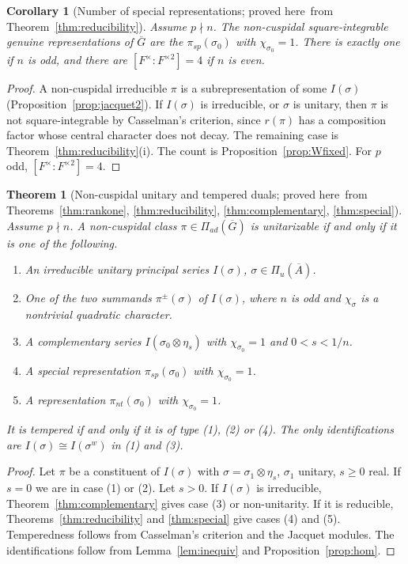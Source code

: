 \documentclass[12pt,letterpaper]{article}
\numberwithin{equation}{section}
\newtheorem{xtheorem}[theorem]{Theorem}
\newtheorem{xcorollary}[theorem]{Corollary}
\theoremstyle{definition}
\newcommand{\proved}{proved here}
\newcommand{\bG}{\overline{G}}
\newcommand{\bA}{\overline{A}}
\newcommand{\Pia}{\Pi_{ad}(\bG)}
\begin{document}
\begin{xcorollary}[Number of special representations; \proved\ from
Theorem~\ref{thm:reducibility}]\label{cor:count-special}
Assume $p\nmid n$.  The non-cuspidal square-integrable genuine representations of $\bG$
are the $\pi_{sp}(\sigma_0)$ with $\chi_{\sigma_0}=1$.  There is exactly one if $n$ is odd,
and there are $[F^\times:F^{\times2}]=4$ if $n$ is even.
\end{xcorollary}
\begin{proof}
A non-cuspidal irreducible $\pi$ is a subrepresentation of some $I(\sigma)$
(Proposition~\ref{prop:jacquet2}).  If $I(\sigma)$ is irreducible, or $\sigma$ is unitary,
then $\pi$ is not square-integrable by Casselman's criterion, since $r(\pi)$ has a
composition factor whose central character does not decay.  The remaining case is
Theorem~\ref{thm:reducibility}(i).  The count is Proposition~\ref{prop:Wfixed}.  For $p$
odd, $[F^\times:F^{\times2}]=4$.
\end{proof}

\begin{xtheorem}[Non-cuspidal unitary and tempered duals; \proved\ from
Theorems~\ref{thm:rankone}, \ref{thm:reducibility}, \ref{thm:complementary},
\ref{thm:special}]\label{thm:unitary-dual}
Assume $p\nmid n$.  A non-cuspidal class $\pi\in\Pia$ is unitarizable if and only if it is
one of the following.
\begin{enumerate}[label=(\arabic*),leftmargin=*,itemsep=1pt]
\item An irreducible unitary principal series $I(\sigma)$, $\sigma\in\Pi_u(\bA)$.
\item One of the two summands $\pi^\pm(\sigma)$ of $I(\sigma)$, where $n$ is odd and
$\chi_\sigma$ is a nontrivial quadratic character.
\item A complementary series $I(\sigma_0\otimes\eta_s)$ with $\chi_{\sigma_0}=1$ and
$0<s<1/n$.
\item A special representation $\pi_{sp}(\sigma_0)$ with $\chi_{\sigma_0}=1$.
\item A representation $\pi_{nt}(\sigma_0)$ with $\chi_{\sigma_0}=1$.
\end{enumerate}
It is tempered if and only if it is of type (1), (2) or (4).  The only identifications are
$I(\sigma)\cong I(\sigma^w)$ in (1) and (3).
\end{xtheorem}
\begin{proof}
Let $\pi$ be a constituent of $I(\sigma)$ with $\sigma=\sigma_1\otimes\eta_s$, $\sigma_1$
unitary, $s\ge0$ real.  If $s=0$ we are in case (1) or (2).  Let $s>0$.  If $I(\sigma)$ is
irreducible, Theorem~\ref{thm:complementary} gives case (3) or non-unitarity.  If it is
reducible, Theorems~\ref{thm:reducibility} and \ref{thm:special} give cases (4) and (5).
Temperedness follows from Casselman's criterion and the Jacquet modules.  The
identifications follow from Lemma~\ref{lem:inequiv} and Proposition~\ref{prop:hom}.
\end{proof}
\end{document}

